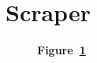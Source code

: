 \section{Scraper}\label{sec:scraper}

\begin{landscape}
	\begin{figure}[!h]
		\caption*{\textbf{Figure~\ref{fig:scraper}}}
		\captionlistentry{}\label{fig:scraper}
	\end{figure}
\end{landscape}
